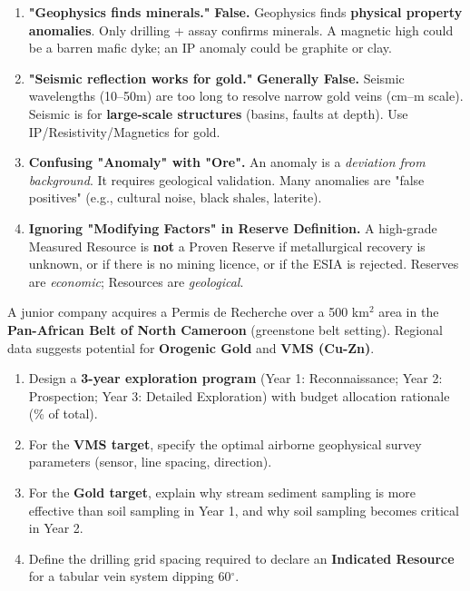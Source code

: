 \documentclass[11pt]{article}
\begin{document}
\begin{attention}
\begin{enumerate}
\item \textbf{"Geophysics finds minerals."} \textbf{False.} Geophysics finds \textbf{physical property anomalies}. Only drilling + assay confirms minerals. A magnetic high could be a barren mafic dyke; an IP anomaly could be graphite or clay.
\item \textbf{"Seismic reflection works for gold."} \textbf{Generally False.} Seismic wavelengths (10--50m) are too long to resolve narrow gold veins (cm--m scale). Seismic is for \textbf{large-scale structures} (basins, faults at depth). Use IP/Resistivity/Magnetics for gold.
\item \textbf{Confusing "Anomaly" with "Ore".} An anomaly is a \emph{deviation from background}. It requires geological validation. Many anomalies are "false positives" (e.g., cultural noise, black shales, laterite).
\item \textbf{Ignoring "Modifying Factors" in Reserve Definition.} A high-grade Measured Resource is \textbf{not} a Proven Reserve if metallurgical recovery is unknown, or if there is no mining licence, or if the ESIA is rejected. Reserves are \emph{economic}; Resources are \emph{geological}.
\end{enumerate}
\end{attention}

\begin{exercice}
A junior company acquires a Permis de Recherche over a 500 km$^2$ area in the \textbf{Pan-African Belt of North Cameroon} (greenstone belt setting). Regional data suggests potential for \textbf{Orogenic Gold} and \textbf{VMS (Cu-Zn)}.
\begin{enumerate}
\item Design a \textbf{3-year exploration program} (Year 1: Reconnaissance; Year 2: Prospection; Year 3: Detailed Exploration) with budget allocation rationale (\% of total).
\item For the \textbf{VMS target}, specify the optimal airborne geophysical survey parameters (sensor, line spacing, direction).
\item For the \textbf{Gold target}, explain why stream sediment sampling is more effective than soil sampling in Year 1, and why soil sampling becomes critical in Year 2.
\item Define the drilling grid spacing required to declare an \textbf{Indicated Resource} for a tabular vein system dipping 60$^\circ$.
\end{enumerate}
\end{exercice}
\end{document}
